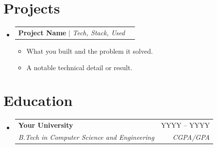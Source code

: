 \documentclass[letterpaper,11pt]{article}
\makeatletter
\newcommand{\resumeItem}[1]{\item\small{{#1 \vspace{-2pt}}}}
\newcommand{\resumeSubheading}[4]{
  \vspace{-2pt}\item
    \begin{tabular*}{0.97\textwidth}[t]{l@{\extracolsep{\fill}}r}
      \textbf{#1} & #2 \\
      \textit{\small#3} & \textit{\small #4} \\
    \end{tabular*}\vspace{-7pt}
}
\newcommand{\resumeProjectHeading}[2]{
    \item
    \begin{tabular*}{0.97\textwidth}{l@{\extracolsep{\fill}}r}
      \small#1 & #2 \\
    \end{tabular*}\vspace{-7pt}
}
\newcommand{\resumeSubHeadingListStart}{\begin{itemize}[leftmargin=0.15in, label={}]}
\newcommand{\resumeSubHeadingListEnd}{\end{itemize}}
\newcommand{\resumeItemListStart}{\begin{itemize}}
\newcommand{\resumeItemListEnd}{\end{itemize}\vspace{-5pt}}
\makeatother
\begin{document}
\section{Projects}
    \resumeSubHeadingListStart
      \resumeProjectHeading
          {\textbf{Project Name} $|$ \emph{Tech, Stack, Used}}{}
          \resumeItemListStart
            \resumeItem{What you built and the problem it solved.}
            \resumeItem{A notable technical detail or result.}
          \resumeItemListEnd
    \resumeSubHeadingListEnd

\section{Education}
  \resumeSubHeadingListStart
    \resumeSubheading
      {Your University}{YYYY -- YYYY}
      {B.Tech in Computer Science and Engineering}{CGPA/GPA}
  \resumeSubHeadingListEnd
\end{document}
